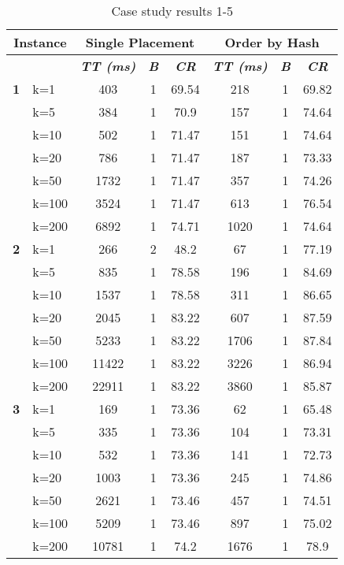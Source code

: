     \begin{table}[htbp]
    \caption{Case study results 1-5}
    \centering
    \begin{tabular}{|l|l|c|c|c|c|c|c|}
    \hline
    \multicolumn{ 2}{|c|}{\textbf{Instance}} & \multicolumn{ 3}{c|}{\textbf{Single Placement}} & \multicolumn{ 3}{c|}{\textbf{Order by Hash}} \\ \hline
    \multicolumn{ 2}{|l|}{} & \textbf{\textit{TT (ms)}} & \textbf{\textit{B}} & \textbf{\textit{CR}} & \textbf{\textit{TT (ms)}} & \textbf{\textit{B}} & \textbf{\textit{CR}} \\ \hline
    \multicolumn{1}{|r|}{\textbf{1}} & k=1 & 403 & 1 & 69.54 & 218 & 1 & 69.82 \\ 
     & k=5 & 384 & 1 & 70.9 & 157 & 1 & 74.64 \\ 
     & k=10 & 502 & 1 & 71.47 & 151 & 1 & 74.64 \\ 
     & k=20 & 786 & 1 & 71.47 & 187 & 1 & 73.33 \\ 
     & k=50 & 1732 & 1 & 71.47 & 357 & 1 & 74.26 \\ 
     & k=100 & 3524 & 1 & 71.47 & 613 & 1 & 76.54 \\ 
     & k=200 & 6892 & 1 & 74.71 & 1020 & 1 & 74.64 \\ \hline
    \multicolumn{1}{|r|}{\textbf{2}} & k=1 & 266 & 2 & 48.2 & 67 & 1 & 77.19 \\ 
     & k=5 & 835 & 1 & 78.58 & 196 & 1 & 84.69 \\ 
     & k=10 & 1537 & 1 & 78.58 & 311 & 1 & 86.65 \\ 
     & k=20 & 2045 & 1 & 83.22 & 607 & 1 & 87.59 \\ 
     & k=50 & 5233 & 1 & 83.22 & 1706 & 1 & 87.84 \\ 
     & k=100 & 11422 & 1 & 83.22 & 3226 & 1 & 86.94 \\ 
     & k=200 & 22911 & 1 & 83.22 & 3860 & 1 & 85.87 \\ \hline
    \multicolumn{1}{|r|}{\textbf{3}} & k=1 & 169 & 1 & 73.36 & 62 & 1 & 65.48 \\ 
     & k=5 & 335 & 1 & 73.36 & 104 & 1 & 73.31 \\ 
     & k=10 & 532 & 1 & 73.36 & 141 & 1 & 72.73 \\ 
     & k=20 & 1003 & 1 & 73.36 & 245 & 1 & 74.86 \\ 
     & k=50 & 2621 & 1 & 73.46 & 457 & 1 & 74.51 \\ 
     & k=100 & 5209 & 1 & 73.46 & 897 & 1 & 75.02 \\ 
     & k=200 & 10781 & 1 & 74.2 & 1676 & 1 & 78.9 \\ \hline

\end{tabular}
\end{table}
